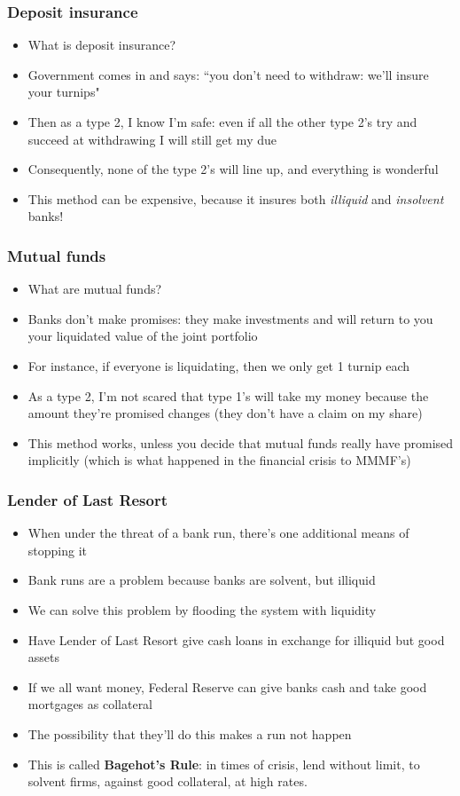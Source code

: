 \documentclass{beamer}
\begin{document}
\begin{frame}
\frametitle{Deposit insurance}
\begin{itemize}
\item<1-> What is deposit insurance?
\bigskip
\item<2-> Government comes in and says:  ``you don't need to withdraw: we'll insure your turnips"  
\bigskip
\item<3-> Then as a type 2, I know I'm safe:  even if all the other type 2's try and succeed at withdrawing I will still get my due
\bigskip
\item<4-> Consequently, none of the type 2's will line up, and everything is wonderful
\bigskip
\item<5-> This method can be expensive, because it insures both \emph{illiquid} and \emph{insolvent} banks!
\end{itemize}
\end{frame}

\begin{frame}
\frametitle{Mutual funds}
\begin{itemize}
\item<1-> What are mutual funds?
\bigskip
\item<2-> Banks don't make promises: they make investments and will return to you your liquidated value of the joint portfolio
\bigskip
\item<3-> For instance, if everyone is liquidating, then we only get 1 turnip each
\bigskip
\item<4-> As a type 2, I'm not scared that type 1's will take my money because the amount they're promised changes (they don't have a claim on my share)
\bigskip
\item<5-> This method works, unless you decide that mutual funds really have promised implicitly (which is what happened in the financial crisis to MMMF's)
\end{itemize}
\end{frame}

\begin{frame}
\frametitle{Lender of Last Resort}
\begin{itemize}
\item<1-> When under the threat of a bank run, there's one additional means of stopping it
\bigskip
\item<2-> Bank runs are a problem because banks are solvent, but illiquid
\bigskip
\item<3-> We can solve this problem by flooding the system with liquidity
\bigskip
\item<4-> Have Lender of Last Resort give cash loans in exchange for illiquid but good assets 
\bigskip
\item<5-> If we all want money, Federal Reserve can give banks cash and take good mortgages as collateral
\bigskip
\item<6-> The possibility that they'll do this makes a run not happen
\bigskip
\item<7-> This is called \textbf{Bagehot's Rule}: in times of crisis, lend without limit, to solvent firms, against good collateral, at high rates.
\end{itemize}
\end{frame}
\end{document}
